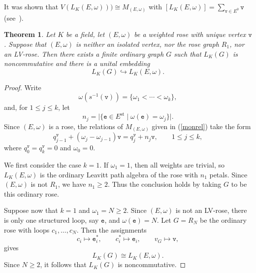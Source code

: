 \documentclass{article}
\newtheorem{theorem}{Theorem}
\theoremstyle{definition}
\begin{document}
It was shown that $V (L_K(E,\omega))) \cong M_{(E,\omega)}$ with $[L_K(E,\omega)]=\sum_{\mathtt{v}\in E^0}\mathtt{v}$ (see~\cite{Pre4,Pre1}). 
\begin{theorem}\label{thm:ordinary-LPA-in-non-LV-rose}
Let $K$ be a field, let $(E,\omega)$ be a weighted rose with unique vertex $\mathtt{v}$. Suppose that $(E,\omega)$ is neither an isolated vertex, nor the rose graph $R_1$, nor an LV-rose. Then there exists a finite ordinary graph $G$ such that $L_K(G)$ is noncommutative and there is a unital embedding
$$
L_K(G)\hookrightarrow L_K(E,\omega).
$$
\end{theorem}

\begin{proof}
Write
$$
\omega(s^{-1}(\mathtt{v}))
=\{\omega_1<\cdots<\omega_k\},
$$
and, for $1\leq j\leq k$, let
$$
n_j=\bigl|\{\mathtt{e}\in E^{\mathrm{st}}
\mid \omega(\mathtt{e})=\omega_j\}\bigr|.
$$
Since $(E,\omega)$ is a rose, the relations of
$M_{(E,\omega)}$ given in (\ref{monrel}) take the form
\begin{equation}\label{eq:rose-monoid-relation}
q^{\mathtt{v}}_{j-1}
+(\omega_j-\omega_{j-1})\mathtt{v}
=
q^{\mathtt{v}}_j+n_j\mathtt{v},
\qquad 1\leq j\leq k,
\end{equation}
where $q^{\mathtt{v}}_0=q^{\mathtt{v}}_k=0$ and $\omega_0=0$.

We first consider the case $k=1$. If $\omega_1=1$, then all weights are
trivial, so $L_K(E,\omega)$ is the ordinary Leavitt path algebra of the rose
with $n_1$ petals. Since $(E,\omega)$ is not $R_1$, we have $n_1\geq2$.
Thus the conclusion holds by taking $G$ to be this ordinary rose.

Suppose now that $k=1$ and $\omega_1=N\geq2$. Since $(E,\omega)$ is not
an LV-rose, there is only one structured loop, say $\mathtt{e}$, and
$\omega(\mathtt{e})=N$. Let $G=R_N$ be the ordinary rose with loops
$c_1,\ldots,c_N$. Then the assignments
$$
c_i\longmapsto \mathtt{e}_i^*,
\qquad
c_i^*\longmapsto \mathtt{e}_i,
\qquad
v_G\longmapsto\mathtt{v},
$$
gives 
$$
L_K(G)\cong L_K(E,\omega).
$$
Since $N\geq2$, it follows that $L_K(G)$ is noncommutative.


\end{proof}
\end{document}
